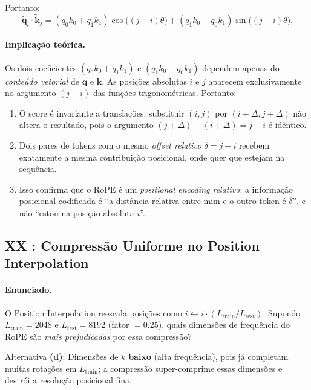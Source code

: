 \documentclass{dlproblemset}
\begin{document}
Portanto:
\[
  \boxed{
  \tilde{\mathbf{q}}_i \cdot \tilde{\mathbf{k}}_j
  = (q_0 k_0 + q_1 k_1)\cos\!\bigl((j-i)\theta\bigr)
    + (q_1 k_0 - q_0 k_1)\sin\!\bigl((j-i)\theta\bigr).
  }
\]

\paragraph{Implicação teórica.}
Os dois coeficientes $(q_0 k_0 + q_1 k_1)$ e $(q_1 k_0 - q_0 k_1)$ dependem
apenas do \emph{conteúdo vetorial} de $\mathbf{q}$ e $\mathbf{k}$.
As posições absolutas $i$ e $j$ aparecem exclusivamente no argumento $(j-i)$ das
funções trigonométricas. Portanto:
\begin{enumerate}[1.]
  \item O score é invariante a translações: substituir $(i,j)$ por $(i+\Delta, j+\Delta)$
        não altera o resultado, pois o argumento $(j+\Delta) - (i+\Delta) = j - i$ é idêntico.
  \item Dois pares de tokens com o mesmo \emph{offset relativo} $\delta = j - i$
        recebem exatamente a mesma contribuição posicional, onde quer que estejam na sequência.
  \item Isso confirma que o RoPE é um \emph{positional encoding relativo}: a informação
        posicional codificada é ``a distância relativa entre mim e o outro token é
        $\delta$'', e não ``estou na posição absoluta $i$''.
\end{enumerate}

\subsection*{XX {\mdseries{}}: Compressão Uniforme no Position Interpolation}

\paragraph{Enunciado.}
O Position Interpolation reescala posições como
$i \leftarrow i \cdot (L_{\mathrm{train}} / L_{\mathrm{test}})$.
Supondo $L_{\mathrm{train}} = 2048$ e $L_{\mathrm{test}} = 8192$ (fator $= 0.25$),
quais dimensões de frequência do RoPE são \emph{mais prejudicadas} por essa compressão?

\begin{respostabox}
Alternativa \textbf{(d)}: Dimensões de $k$ \textbf{baixo} (alta frequência), pois já
completam muitas rotações em $L_{\mathrm{train}}$; a compressão super-comprime essas
dimensões e destrói a resolução posicional fina.
\end{respostabox}
\end{document}
